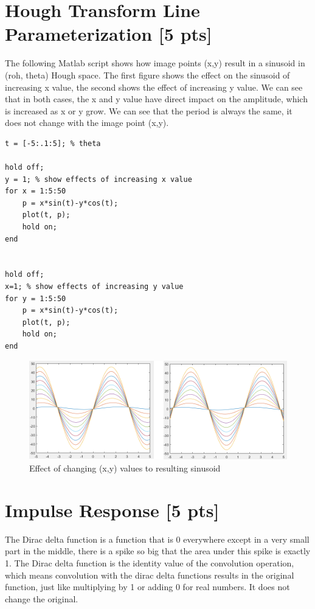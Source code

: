 \documentclass[12pt,a4paper]{article}
\begin{document}
\section{Hough Transform Line Parameterization [5 pts]}

The following Matlab script shows how image points (x,y) result in a sinusoid in (roh, theta) Hough space. The first figure shows the effect on the sinusoid of increasing x value, the second shows the effect of increasing y value.
We can see that in both cases, the x and y value have direct impact on the amplitude, which is increased as x or y grow.
We can see that the period is always the same, it does not change with the image point (x,y).

\begin{lstlisting}
t = [-5:.1:5]; % theta

hold off;
y = 1; % show effects of increasing x value
for x = 1:5:50
    p = x*sin(t)-y*cos(t);
    plot(t, p);
    hold on;
end


hold off;
x=1; % show effects of increasing y value
for y = 1:5:50
    p = x*sin(t)-y*cos(t);
    plot(t, p);
    hold on;
end
\end{lstlisting}


\begin{figure}[!h]
    \begin{center}
        \includegraphics[width=1.0\textwidth]{assets/ht.png}
        \caption{Effect of changing (x,y) values to resulting sinusoid}
        \label{fig:hough_transform}
    \end{center}
\end{figure}


\section{Impulse Response [5 pts]}
The Dirac delta function is a function that is 0 everywhere except in a very small part in the middle, there is a spike so big that the area under this spike is exactly 1.
The Dirac delta function is the identity value of the convolution operation, which means convolution with the dirac delta functions results in the original function, just like multiplying by 1 or adding 0 for real numbers. It does not change the original.
\end{document}
